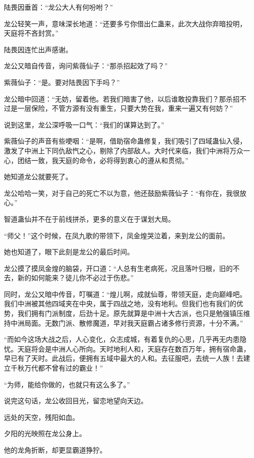 \begin{this_body}
陆畏因垂首：“龙公大人有何吩咐？”

龙公轻笑一声，意味深长地道：“还要多亏你借出仁蛊来，此次大战你弃暗投明，天庭将不吝封赏。”

陆畏因连忙出声感谢。

龙公又暗自传音，询问紫薇仙子：“那杀招起效了吗？”

紫薇仙子：“是。要对陆畏因下手吗？”

龙公暗中回道：“无妨，留着他。若我们暗害了他，以后谁敢投靠我们？那杀招不过是一层保险，不管方源有没有重生，只要大势在我，重来一遍又有何妨？”

说到这里，龙公深呼吸一口气：“我们的谋算达到了。”

紫薇仙子的声音有些哽咽：“是啊，借助宿命蛊修复，我们吸引了四域蛊仙入侵，激发了中洲上下同仇敌忾之心，剔除了内部敌人。大时代来临，我们中洲将万众一心，团结一致，我天庭的命令，必将得到衷心的遵从和贯彻。”

她知道龙公就要死了。

龙公哈哈一笑，对于自己的死亡不以为意，他还鼓励紫薇仙子：“有你在，我很放心。”

智道蛊仙并不在于前线拼杀，更多的意义在于谋划大局。

“师父！”这个时候，在凤九歌的带领下，凤金煌哭泣着，来到龙公的面前。

她也知道了，眼下此刻是龙公的最后时间。

龙公摸了摸凤金煌的脑袋，开口道：“人总有生老病死，况且落叶归根，旧的不去，新的如何能来？徒儿你不必过于伤悲。”

同时，龙公又暗中传音，叮嘱道：“煌儿啊，成就仙尊，带领天庭，走向巅峰吧。我们中洲被其他四域夹在中央，属于四战之地，没有地利。但我们也有我们的优势，我们拥有门派制度，后劲十足。原先就算是中洲十大古派，也只是勉强镇压维持中洲局面。无数门派、散修魔道，早对我天庭霸占诸多修行资源，十分不满。”

“而如今这场大战之后，人心变化，众志成城，有着复仇的心思，几乎再无内患隐忧。天庭将会是中洲人心所向。天时地利人和，天庭存在数百万年，拥有宿命蛊，早已有了天时。此战后，便拥有五域中最大的人和。去征服吧，去统一人族！去建立千秋万代都不曾有过的霸业！”

“为师，能给你做的，也就只有这么多了。”

说完这句话，龙公收回目光，留恋地望向天边。

远处的天空，残阳如血。

夕阳的光映照在龙公身上。

他的龙角折断，却更显霸道狰狞。


\end{this_body}
